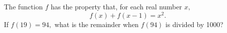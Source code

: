 The function $f$ has the property that, for each real number $x,$ \[ f(x)+f(x-1) = x^2. \] If $f(19)=94,$ what is the remainder when $f(94)$ is divided by 1000?